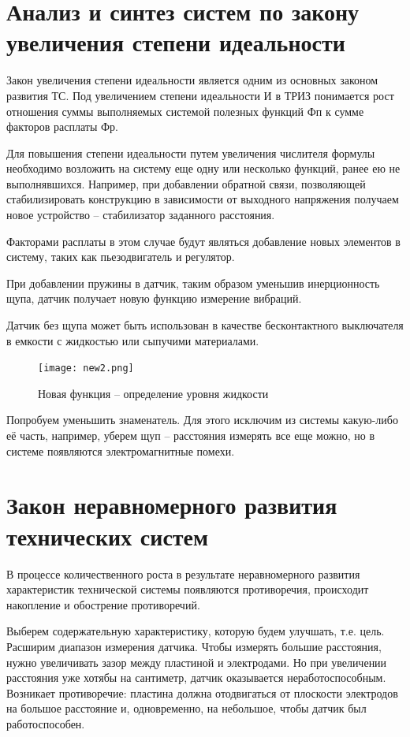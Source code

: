 \section{Анализ и синтез систем по закону увеличения степени идеальности}

Закон увеличения степени идеальности является одним из основных законом развития ТС. Под увеличением степени идеальности И в ТРИЗ понимается рост отношения суммы выполняемых системой полезных функций Фп к сумме факторов расплаты Фр.

Для повышения степени идеальности путем увеличения числителя формулы необходимо возложить на систему еще одну или несколько функций, ранее ею не выполнявшихся. Например, при добавлении обратной связи, позволяющей стабилизировать конструкцию в зависимости от выходного напряжения получаем новое устройство -- стабилизатор заданного расстояния. 

Факторами расплаты в этом случае будут являться добавление новых элементов в систему, таких как пьезодвигатель и регулятор. 

При добавлении пружины в датчик, таким образом уменьшив инерционность щупа, датчик получает новую функцию измерение вибраций.

Датчик без щупа может быть использован в качестве бесконтактного выключателя в емкости с жидкостью или сыпучими материалами.

\begin{figure}[h!]
	\centering
	\texttt{[image: new2.png]}
	\caption{Новая функция -- определение уровня жидкости}
	\label{sogl3}
\end{figure}

Попробуем уменьшить знаменатель. Для этого исключим из системы какую-либо её часть, например, уберем щуп -- расстояния измерять все еще можно, но в системе появляются электромагнитные помехи.

\section{Закон неравномерного развития технических систем}

В процессе количественного роста в результате неравномерного развития характеристик технической системы появляются противоречия, происходит накопление и обострение противоречий.

Выберем содержательную характеристику, которую будем улучшать, т.е. цель. Расширим диапазон измерения датчика. Чтобы измерять большие расстояния, нужно увеличивать зазор между пластиной и электродами. Но при увеличении расстояния уже хотябы на сантиметр, датчик оказывается неработоспособным. Возникает противоречие: пластина должна отодвигаться от плоскости электродов на большое расстояние и, одновременно, на небольшое, чтобы датчик был работоспособен.

